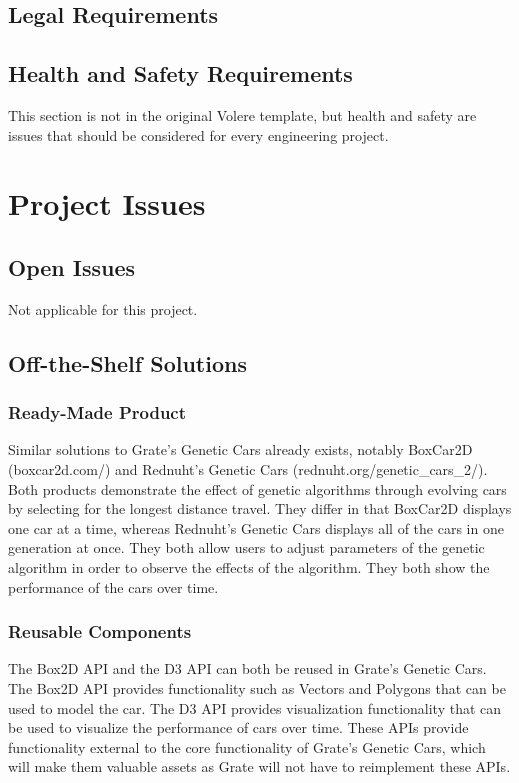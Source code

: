 \documentclass[12pt, titlepage]{article}
\begin{document}
\subsection{Legal Requirements}

\subsection{Health and Safety Requirements}

This section is not in the original Volere template, but health and safety are
issues that should be considered for every engineering project.

\section{Project Issues}

\subsection{Open Issues}
Not applicable for this project.

\subsection{Off-the-Shelf Solutions}

\subsubsection{Ready-Made Product}
Similar solutions to Grate's Genetic Cars already exists, notably BoxCar2D 
(boxcar2d.com/) and Rednuht's Genetic Cars (rednuht.org/genetic\_cars\_2/). Both 
products demonstrate the effect of genetic algorithms through evolving cars by 
selecting for the longest distance travel. They differ in that BoxCar2D displays 
one car at a time, whereas Rednuht's Genetic Cars displays all of the cars in 
one generation at once. They both allow users to adjust parameters of the 
genetic algorithm in order to observe the effects of the algorithm. They both 
show the performance of the cars over time.

\subsubsection{Reusable Components}
The Box2D API and the D3 API can both be reused in Grate's Genetic Cars. The 
Box2D API provides functionality such as Vectors and Polygons that can be used 
to model the car. The D3 API provides visualization functionality that can be 
used to visualize the performance of cars over time. These APIs provide 
functionality external to the core functionality of Grate's Genetic Cars, which 
will make them valuable assets as Grate will not have to reimplement these APIs.
\end{document}
